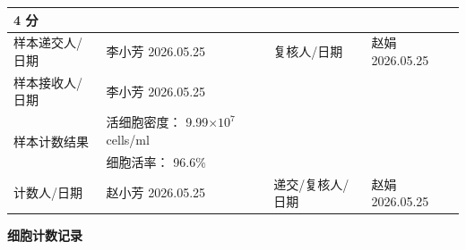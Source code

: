 \documentclass[UTF8,10pt,a4paper,fontset=fandol]{ctexart}
\newcommand{\fieldvalue}[1]{#1}
\newcommand{\handwritten}[1]{#1}
\begin{document}
\begin{tabularx}{\textwidth}{|p{3.1cm}|X|p{3.1cm}|X|}
{%
\fieldvalue{\handwritten{4}} 分
}\\
\hline
样本递交人/日期 &
\fieldvalue{\handwritten{李小芳}} \quad
\fieldvalue{\handwritten{2026.05.25}} &
复核人/日期 &
\fieldvalue{\handwritten{赵娟}} \quad
\fieldvalue{\handwritten{2026.05.25}}\\
\hline
样本接收人/日期 &
\fieldvalue{\handwritten{李小芳}} \quad
\fieldvalue{\handwritten{2026.05.25}} &
\multicolumn{2}{l|}{}\\
\hline
\multirow{2}{*}{样本计数结果} &
活细胞密度：
\fieldvalue{\handwritten{9.99}}$\times 10^7$ cells/ml
& \multicolumn{2}{l|}{}\\
\cline{2-4}
&
细胞活率：
\fieldvalue{\handwritten{96.6}}\% &
\multicolumn{2}{l|}{}\\
\hline
计数人/日期 &
\fieldvalue{\handwritten{赵小芳}} \quad
\fieldvalue{\handwritten{2026.05.25}} &
递交/复核人/日期 &
\fieldvalue{\handwritten{赵娟}} \quad
\fieldvalue{\handwritten{2026.05.25}}\\
\hline
\end{tabularx}

\vspace{0.5em}
\begin{center}
    {\bfseries 细胞计数记录}
\end{center}
\end{document}
